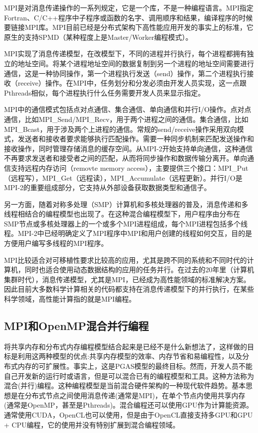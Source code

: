 MPI\citep{pacheco1997parallel}是对消息传递操作的一系列规定，它是一个库，不是一种编程语言。MPI指定Fortran、C/C++程序中子程序或函数的名字、调用顺序和结果，编译程序的时候要链接MPI库。MPI目前已经是分布式架构下高性能应用开发的事实上的标准，它原生的支持SPMD\citep{mattson2004patterns}（某种程度上是Master/Worker编程模式）。  

MPI实现了消息传递模型\citep{gropp1999using}，在改模型下，不同的进程并行执行，每个进程都拥有独立的地址空间。将某个进程地址空间的数据复制到另一个进程的地址空间需要进行通信，这是一种协同操作，第一个进程执行发送（send）操作，第二个进程执行接收（receive）操作。在MPI中，任务划分和分发必须由开发人员实现，这一点跟Pthreads相似，每个进程执行什么任务需要开发人员来显示指定。  

MPI中的通信模式包括点对点通信、集合通信、单向通信和并行I/O操作。点对点通信，比如MPI\_Send/MPI\_Recv，用于两个进程之间的通信。集合通信，比如MPI\_Bcast，用于涉及两个上进程的通信。常规的send/receive操作采用双向模式，发送者和接收者要求能够执行匹配操作。需要一种同步机制来匹配发送操作和接收操作，同时管理存储消息的缓存空间。从MPI-2\citep{mpi2003mpi2}开始支持单向通信，这种通信不再要求发送者和接受者之间的匹配，从而将同步操作和数据传输分离开。单向通信支持远程内存访问（removte memory access），主要提供三个接口：MPI\_Put（远程写），MPI\_Get（远程读），MPI\_Accumulate（远程更新）。并行I/O是MPI-2的重要组成部分，它支持从外部设备获取数据类型和通信子\citep{gropp1999using}。  

另一方面，随着对称多处理（SMP）计算机和多核处理器的普及，消息传递和多线程相结合的编程模型也出现了。在这种混合编程模型下，用户程序由分布在SMP节点或多核处理器上的一个或多个MPI进程组成，每个MPI进程包括多个线程。MPI-2中已经明确定义了MPI程序中MPI和用户创建的线程如何交互，目的是方便用户编写多线程的MPI程序。  

MPI比较适合对可移植性要求比较高的应用，尤其是跨不同的系统和不同时代的计算机，同时也适合使用动态数据结构的应用的任务并行。在过去的20年里（计算机集群时代），消息传递模型，尤其是MPI，已经成为高性能领域的标准解决方案。因此目前大多数科学计算相关的代码都支持在消息传递模型下的并行执行，在某些科学领域，高性能计算指的就是MPI编程。


\subsection{MPI和OpenMP混合并行编程}

将共享内存和分布式内存编程模型结合起来是已经不是什么新想法了\citep{sterling1995enabling}，这样做的目标是利用这两种模型的优点:共享内存模型的效率、内存节省和易编程性，以及分布式内存的可扩展性。事实上，这是PGAS模型的最终目标。然而，开发人员不能自己开发新的运行时或语言，但是可以混合已有的编程模型和工具。这种方法称为混合(并行)编程。这种编程模型是当前混合硬件架构的一种现代软件趋势。基本思想是在分布式节点之间使用消息传递(通常是MPI)，在单个节点内使用共享内存(通常是OpenMP，甚至是Pthreads)。混合编程还可以使用GPU作为计算能资源。通常使用CUDA，OpenCL也可以使用，但是由于OpenCL直接支持多GPU和GPU + CPU编程，它的使用并没有特别扩展到混合编程领域。

